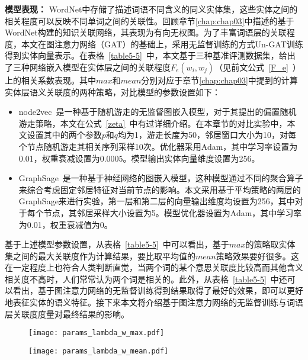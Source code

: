 \textbf{模型表现：}
WordNet中存储了描述词语不同含义的同义实体集，这些实体之间的相关程度可以反映不同单词之间的关联性。回顾章节\ref{chap:chap03}中描述的基于WordNet构建的知识关联网络，其表现为有向无权图。为了丰富词语层的关联程度，本文在图注意力网络（GAT）的基础上，采用无监督训练的方式Un-GAT训练得到实体向量表示。在表格~\ref{table5-5}~中，本文基于三种基准评测数据集，给出了三种网络嵌入模型在实体层之间的关联程度$F_e(w_i, w_j)$（见前文公式~\ref{F_e}~）上的相关系数表现。其中$max$和$mean$分别对应于章节\ref{chap:chap03}中提到的计算实体层语义关联度的两种策略，对比模型的参数设置如下：
\begin{itemize}
    \item node2vec~\cite{kdd/GroverL16}是一种基于随机游走的无监督图嵌入模型，对于其提出的偏置随机游走策略，本文在公式~\ref{zeta}~中有过详细介绍。在本章节的对比实验中，本文设置其中的两个参数$p$和$q$均为1，游走长度为50，邻居窗口大小为10，对每个节点随机游走其相关序列采样10次。优化器采用Adam，其中学习率设置为0.01，权重衰减设置为0.0005。模型输出实体向量维度设置为256。
    \item GraphSage~\cite{nips/HamiltonYL17}是一种基于神经网络的图嵌入模型，这种模型通过不同的聚合算子来综合考虑固定邻居特征对当前节点的影响。本文采用基于平均策略的两层的GraphSage来进行实验，第一层和第二层的向量输出维度均设置为256，其中对于每个节点，其邻居采样大小设置为5。模型优化器设置为Adam，其中学习率为0.01，权重衰减值为0。
\end{itemize}

基于上述模型参数设置，从表格~\ref{table5-5}~中可以看出，基于$max$的策略取实体集之间的最大关联度作为计算结果，要比取平均值的$mean$策略效果要好很多。这在一定程度上也符合人类判断直觉，当两个词的某个意思关联度比较高而其他含义相关度不高时，人们常常认为两个词是相关的。此外，从表格~\ref{table5-5}~中还可以看出，基于图注意力网络的无监督训练得到结果取得了最好的效果，即可以更好地表征实体的语义特征。接下来本文将介绍基于图注意力网络的无监督训练与词语层关联度度量对最终结果的影响。

\begin{figure}[htbp]
    \begin{minipage}{0.48\textwidth}
      \centering
      \texttt{[image: params\_lambda\_w\_max.pdf]}
      \label{fig:lambda_w_max}
    \end{minipage}\hfill
    \begin{minipage}{0.48\textwidth}
      \centering
      \texttt{[image: params\_lambda\_w\_mean.pdf]}
      \label{fig:lambda_w_mean}
    \end{minipage}
    \label{fig:wordnet_sr}
\end{figure}

